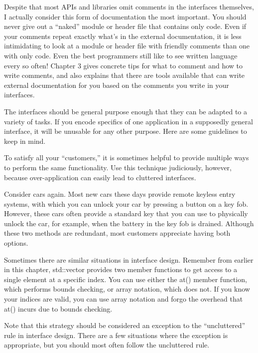 Despite that most APIs and libraries omit comments in the interfaces themselves, I actually consider this form of documentation the most important. You should never give out a “naked” module or header file that contains only code. Even if your comments repeat exactly what’s in the external documentation, it is less intimidating to look at a module or header file with friendly comments than one with only code. Even the best programmers still like to see written language every so often! Chapter 3 gives concrete tips for what to comment and how to write comments, and also explains that there are tools available that can write external documentation for you based on the comments you write in your interfaces.


The interfaces should be general purpose enough that they can be adapted to a variety of tasks. If you encode specifics of one application in a supposedly general interface, it will be unusable for any other purpose. Here are some guidelines to keep in mind.


To satisfy all your “customers,” it is sometimes helpful to provide multiple ways to perform the same functionality. Use this technique judiciously, however, because over-application can easily lead to cluttered interfaces.

Consider cars again. Most new cars these days provide remote keyless entry systems, with which you can unlock your car by pressing a button on a key fob. However, these cars often provide a standard key that you can use to physically unlock the car, for example, when the battery in the key fob is drained. Although these two methods are redundant, most customers appreciate having both options.

Sometimes there are similar situations in interface design. Remember from earlier in this chapter, std::vector provides two member functions to get access to a single element at a specific index. You can use either the at() member function, which performs bounds checking, or array notation, which does not. If you know your indices are valid, you can use array notation and forgo the overhead that at() incurs due to bounds checking.

Note that this strategy should be considered an exception to the “uncluttered” rule in interface design. There are a few situations where the exception is appropriate, but you should most often follow the uncluttered rule.

